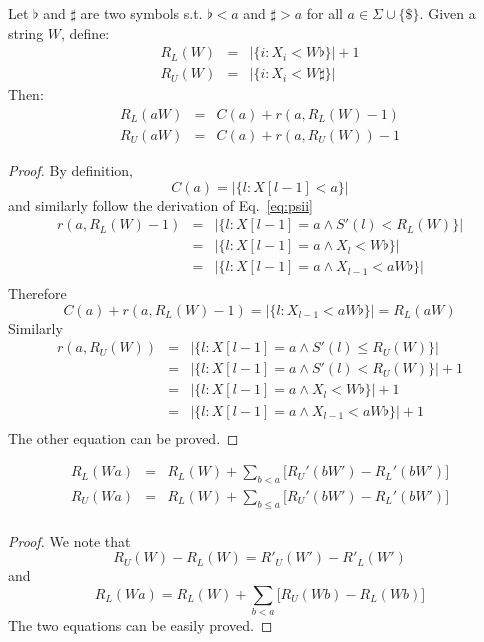 \documentclass{bioinfo}
\begin{document}
\begin{methods}
\begin{lem}
Let $\flat$ and $\sharp$ are two symbols s.t. $\flat<a$ and $\sharp>a$ for all $a\in\Sigma\cup\{\$\}$.
Given a string $W$, define:
\begin{eqnarray*}
R_L(W)&=&\big|\{i:X_i<W\flat\}\big| + 1 \\
R_U(W)&=&\big|\{i:X_i<W\sharp\}\big|
\end{eqnarray*}
Then:
\begin{eqnarray}
R_L(aW)&=&C(a)+r(a,R_L(W)-1)\\
R_U(aW)&=&C(a)+r(a,R_U(W))-1
\end{eqnarray}
\end{lem}
\begin{proof}
By definition,
$$C(a)=\big|\{l:X[l-1]<a\}\big|$$
and similarly follow the derivation of Eq.~\eqref{eq:psii}
\begin{eqnarray*}
r(a,R_L(W)-1)&=&\big|\{l:X[l-1]=a\land S'(l)<R_L(W)\}\big|\\
&=&\big|\{l:X[l-1]=a\land X_l<W\flat\}\big|\\
&=&\big|\{l:X[l-1]=a\land X_{l-1}<aW\flat\}\big|\\
\end{eqnarray*}
Therefore
$$
C(a)+r(a,R_L(W)-1)=\big|\{l:X_{l-1}<aW\flat\}\big|=R_L(aW)
$$
Similarly
\begin{eqnarray*}
r(a,R_U(W))&=&\big|\{l:X[l-1]=a\land S'(l)\le R_U(W)\}\big|\\
&=&\big|\{l:X[l-1]=a\land S'(l)<R_U(W)\}\big|+1\\
&=&\big|\{l:X[l-1]=a\land X_l<W\flat\}\big|+1\\
&=&\big|\{l:X[l-1]=a\land X_{l-1}<aW\flat\}\big|+1\\
\end{eqnarray*}
The other equation can be proved.

\raggedleft{\qedsymbol}
\end{proof}

\begin{lem}
\begin{eqnarray*}
R_L(Wa)&=&R_L(W)+\sum_{b<a}\Big[R_U'(bW')-R_L'(bW')\Big]\\
R_U(Wa)&=&R_L(W)+\sum_{b\le a}\Big[R_U'(bW')-R_L'(bW')\Big]\\
\end{eqnarray*}
\end{lem}
\begin{proof}
We note that
$$
R_U(W)-R_L(W)=R'_U(W')-R'_L(W')
$$
and
$$
R_L(Wa)=R_L(W)+\sum_{b<a}\Big[R_U(Wb)-R_L(Wb)\Big]
$$
The two equations can be easily proved.

\raggedleft{\qedsymbol}
\end{proof}

\end{methods}
\end{document}
